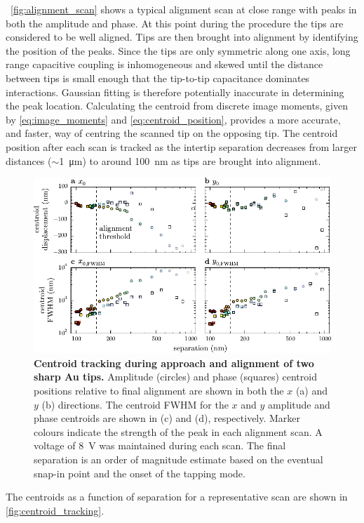 \documentclass{article}
\begin{document}
\figurename~\ref{fig:alignment_scan} shows a typical alignment scan at close range with peaks in both the amplitude and phase. At this point during the procedure the tips are considered to be well aligned. Tips are then brought into alignment by identifying the position of the peaks. Since the tips are only symmetric along one axis, long range capacitive coupling is inhomogeneous and skewed until the distance between tips is small enough that the tip-to-tip capacitance dominates interactions. Gaussian fitting is therefore potentially inaccurate in determining the peak location. Calculating the centroid from discrete image moments, given by \eqref{eq:image_moments} and \eqref{eq:centroid_position}, provides a more accurate, and faster, way of centring the scanned tip on the opposing tip. The centroid position after each scan is tracked as the intertip separation decreases from larger distances ($\sim$\SI{1}{\micro\metre}) to around \SI{100}{nm} as tips are brought into alignment.
\begin{figure}[bt]
\centering
\includegraphics{figures/centroid_tracking}
\caption[Centroid tracking during approach and alignment of two sharp Au tips]{\textbf{Centroid tracking during approach and alignment of two sharp Au tips.} Amplitude (circles) and phase (squares) centroid positions relative to final alignment are shown in both the $x$ (a) and $y$ (b) directions. The centroid FWHM for the $x$ and $y$ amplitude and phase centroids are shown in (c) and (d), respectively. Marker colours indicate the strength of the peak in each alignment scan. A voltage of \SI{8}{V} was maintained during each scan. The final separation is an order of magnitude estimate based on the eventual snap-in point and the onset of the tapping mode.}
\label{fig:centroid_tracking}
\end{figure}
The centroids as a function of separation for a representative scan are shown in \autoref{fig:centroid_tracking}.
\end{document}

